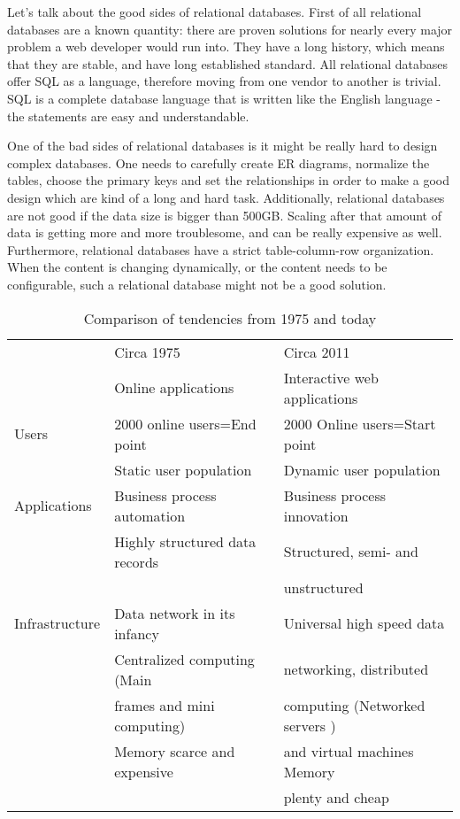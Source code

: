 \documentclass{article}
\begin{document}
Let's talk about the good sides of relational databases. First of all relational databases are a known quantity: there are proven solutions for nearly every major problem a web developer would run into. They have a long history, which means that they are stable, and have long established standard. All relational databases offer SQL as a language, therefore moving from one vendor to another is trivial. SQL is a complete database language that is written like the English language - the statements are easy and understandable. 

One of the bad sides of relational databases is it might be really hard to design complex databases. One needs to carefully create ER diagrams, normalize the tables, choose the primary keys and set the relationships in order to make a good design which are kind of a long and hard task. Additionally, relational databases are not good if the data size is bigger than 500GB. Scaling after that amount of data is getting more and more troublesome, and can be really expensive as well. Furthermore, relational databases have a strict table-column-row organization. When the content is changing dynamically, or the content needs to be configurable, such a relational database might not be a good solution.

\begin{table}[h]
\centering
\begin{tabular}{| l | l | l |}
\hline
				&	Circa 1975						&	Circa 2011	    					\\
				&	Online applications				&	Interactive web applications		\\
\hline \hline
Users 			&	2000 online users=End point		&	2000 Online users=Start point		\\
				&	Static user population			&	Dynamic user population				\\
\hline
Applications 	&	Business process automation		&	Business process innovation			\\
				&	Highly structured data records	&	Structured, semi- and 				\\
				&									&	unstructured						\\
\hline
Infrastructure 	&	Data network in its infancy		&	Universal high speed data 			\\
				&	Centralized computing (Main		&	networking, distributed  			\\
				&		frames and mini computing)	&	computing (Networked servers )		\\				
				& 	Memory scarce and expensive		&	and virtual machines Memory  		\\
				& 	                         		&	plenty and cheap					\\
\hline 
\end{tabular}
	\caption{Comparison of tendencies from 1975 and today}
	\label{tab:nowandthen}
\end{table}
\end{document}

